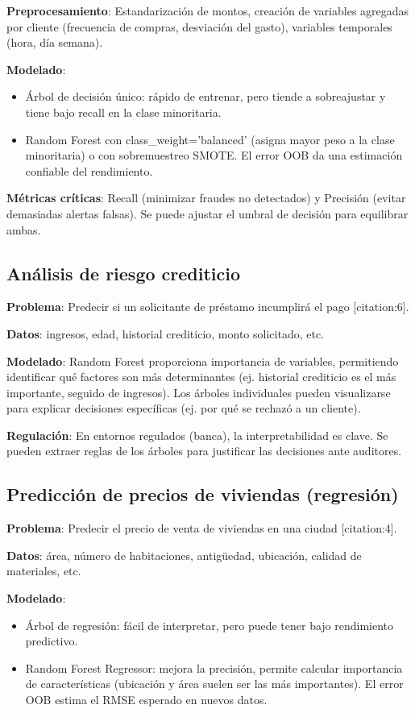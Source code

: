\documentclass[12pt,a4paper,openany,oneside]{book}
\begin{document}
\textbf{Preprocesamiento}: Estandarización de montos, creación de variables agregadas por cliente (frecuencia de compras, desviación del gasto), variables temporales (hora, día semana).

\textbf{Modelado}:
\begin{itemize}
    \item Árbol de decisión único: rápido de entrenar, pero tiende a sobreajustar y tiene bajo recall en la clase minoritaria.
    \item Random Forest con class\_weight='balanced' (asigna mayor peso a la clase minoritaria) o con sobremuestreo SMOTE. El error OOB da una estimación confiable del rendimiento.
\end{itemize}

\textbf{Métricas críticas}: Recall (minimizar fraudes no detectados) y Precisión (evitar demasiadas alertas falsas). Se puede ajustar el umbral de decisión para equilibrar ambas.

\subsection{Análisis de riesgo crediticio}
\textbf{Problema}: Predecir si un solicitante de préstamo incumplirá el pago [citation:6].

\textbf{Datos}: ingresos, edad, historial crediticio, monto solicitado, etc.

\textbf{Modelado}: Random Forest proporciona importancia de variables, permitiendo identificar qué factores son más determinantes (ej. historial crediticio es el más importante, seguido de ingresos). Los árboles individuales pueden visualizarse para explicar decisiones específicas (ej. por qué se rechazó a un cliente).

\textbf{Regulación}: En entornos regulados (banca), la interpretabilidad es clave. Se pueden extraer reglas de los árboles para justificar las decisiones ante auditores.

\subsection{Predicción de precios de viviendas (regresión)}
\textbf{Problema}: Predecir el precio de venta de viviendas en una ciudad [citation:4].

\textbf{Datos}: área, número de habitaciones, antigüedad, ubicación, calidad de materiales, etc.

\textbf{Modelado}:
\begin{itemize}
    \item Árbol de regresión: fácil de interpretar, pero puede tener bajo rendimiento predictivo.
    \item Random Forest Regressor: mejora la precisión, permite calcular importancia de características (ubicación y área suelen ser las más importantes). El error OOB estima el RMSE esperado en nuevos datos.
\end{itemize}
\end{document}
